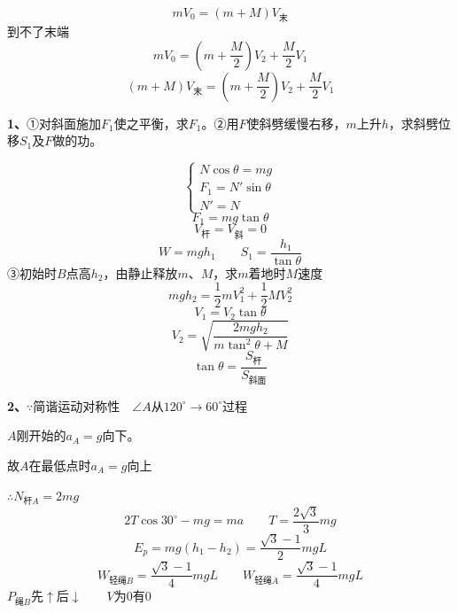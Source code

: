\[ mV_0=(m+M)V_{\text{末}} \]
到不了末端
\[ mV_0=\left(m+\dfrac{M}{2}\right)V_2+\dfrac{M}{2}V_1 \]
\[ (m+M)V_{\text{末}}=\left(m+\dfrac{M}{2}\right)V_2+\dfrac{M}{2}V_1 \]
\begin{problem}[1]
\textbf{1、}①对斜面施加$F_1$使之平衡，求$F_1$。②用$F$使斜劈缓慢右移，$m$上升$h$，求斜劈位移$S_1$及$F$做的功。%
\begin{solution}
\[ \begin{cases}
N\cos\theta=mg\\
F_1=N'\sin\theta\\
N'=N
\end{cases} \]
\[ F_1=mg\tan\theta \]
\[ V_{\text{杆}}=V_{\text{斜}}=0 \]
\[ W=mgh_1\qquad S_1=\dfrac{h_1}{\tan\theta} \]
③初始时$B$点高$h_2$，由静止释放$m$、$M$，求$m$着地时$M$速度
\[ mgh_2=\dfrac{1}{2}mV_1^2+\dfrac{1}{2}MV_2^2 \]
\[ V_1=V_2\tan\theta \]
\[ V_2=\sqrt{\dfrac{2mgh_2}{m\tan^2\theta+M}} \]
\[ \tan\theta=\dfrac{S_{\text{杆}}}{S_{\text{斜面}}} \]
\end{solution}
\end{problem}
\begin{problem}[2]
\textbf{2、}$\because$简谐运动对称性　$\angle A$从$120^\circ\to60^\circ$过程
\begin{solution}
$A$刚开始的$a_A=g$向下。

故$A$在最低点时$a_A=g$向上

$\therefore N_{\text{杆}A}=2mg$
\[ 2T\cos30^\circ-mg=ma\qquad T=\dfrac{2\sqrt{3}}{3}mg \]
\[ E_p=mg(h_1-h_2)=\dfrac{\sqrt{3}-1}{2}mgL \]
\[ W_{\text{轻绳}B}=\dfrac{\sqrt{3}-1}{4}mgL\qquad W_{\text{轻绳}A}=\dfrac{\sqrt{3}-1}{4}mgL \]
$P_{\text{绳}B}$先$\uparrow$后$\downarrow$　　$V$为0有0
\end{solution}
\end{problem}
